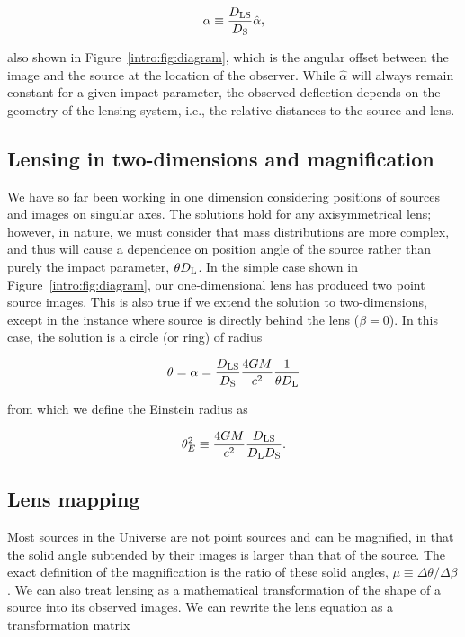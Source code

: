 \begin{equation}
\alpha \equiv  \frac{D_\mathrm{LS}}{D_\mathrm{S}} \hat\alpha,
\label{intro:eqn:dlsds}
\end{equation}

\noindent also shown in Figure~\ref{intro:fig:diagram}, which is the angular offset between the image and the source at the location of the observer. While $\hat\alpha$ will always remain constant for a given impact parameter, the observed deflection depends on the geometry of the lensing system, i.e., the relative distances to the source and lens.

\subsection{Lensing in two-dimensions and magnification}
\label{intro:sec:magnification}

We have so far been working in one dimension considering positions of sources and images on singular axes. The solutions hold for any axisymmetrical lens; however, in nature, we must consider that mass distributions are more complex, and thus will cause a dependence on position angle of the source rather than purely the impact parameter, $\theta D_\mathrm{L}$. In the simple case shown in Figure~\ref{intro:fig:diagram}, our one-dimensional lens has produced two point source images. This is also true if we extend the solution to two-dimensions, except in the instance where source is directly behind the lens ($\beta=0$). In this case, the solution is a circle (or ring) of radius

\begin{equation}
\theta = \alpha = \frac{D_\mathrm{LS}}{D_\mathrm{S}} \frac{4GM}{c^2} \frac{1}{\theta D_\mathrm{L}}
\end{equation} 

\noindent from which we define the Einstein radius as

\begin{equation}
\theta_E^2 \equiv \frac{4GM}{c^2} \frac{D_\mathrm{LS}}{D_\mathrm{L}D_\mathrm{S}}.
\label{intro:eqn:einstein_radius}
\end{equation}

\subsection{Lens mapping}

Most sources in the Universe are not point sources and can be magnified, in that the solid angle subtended by their images is larger than that of the source. The exact definition of the magnification is the ratio of these solid angles,
$\mu \equiv \Delta \theta/\Delta \beta$. We can also treat lensing as a mathematical transformation of the shape of a source into its observed images. We can rewrite the lens equation as a transformation matrix


